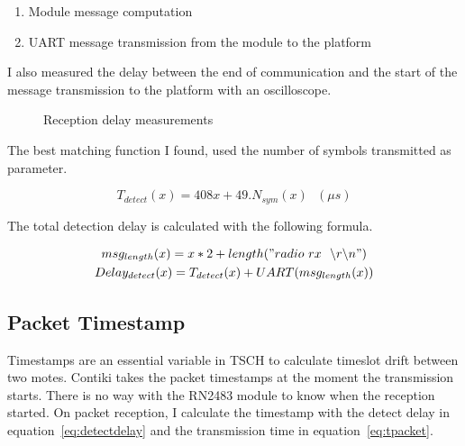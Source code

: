 \begin{enumerate}
  \item Module message computation
  \item UART message transmission from the module to the platform
\end{enumerate}

I also measured the delay between the end of communication and the start of the
message transmission to the platform with an oscilloscope.

\begin{figure}[H]
  \centering
  \caption{Reception delay measurements\label{fig:transmissiondelay}}
\end{figure}

The best matching function I found, used the number of symbols transmitted as
parameter.

\begin{equation}
  \label{eq:detectcomp}
  T_{detect}(x) = 408x + 49 . N_{sym}(x) \ \ \ (\mu s)
\end{equation}

The total detection delay is calculated with the following formula.

\begin{gather}
  msg_{length}(x) = x * 2 + length("radio~rx~~\backslash r \backslash n") \\
  \label{eq:detectdelay}
  Delay_{detect}(x) = T_{detect}(x) + UART(msg_{length}(x))
\end{gather}

\subsection{Packet Timestamp}

Timestamps are an essential variable in TSCH to calculate timeslot drift
between two motes. 
Contiki takes the packet timestamps at the moment the transmission starts.
There is no way with the RN2483 module to know when the reception started.
On packet reception, I calculate the timestamp with the detect delay 
in equation~\ref{eq:detectdelay} and the transmission time in
equation~\ref{eq:tpacket}.

